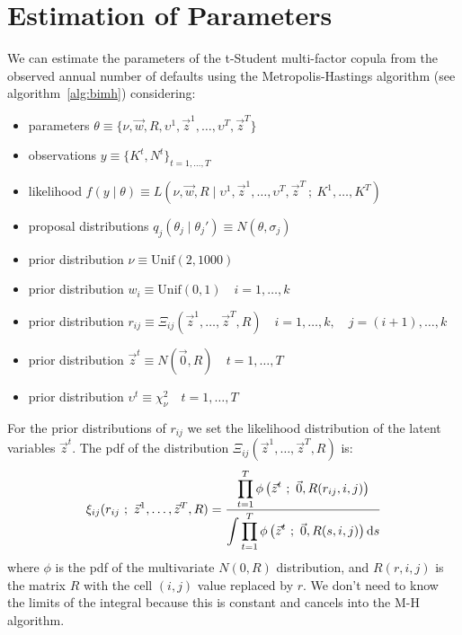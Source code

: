 \documentclass[11pt,fleqn]{book} %
\begin{document}
\section{Estimation of Parameters}

\begin{proposition}
	\label{prop:pemh}
	We can estimate the parameters of the t-Student multi-factor copula from 
	the observed annual number of defaults using the Metropolis-Hastings 
	algorithm (see algorithm~\ref{alg:bimh}) considering:
	\begin{itemize}
		\item parameters $\theta \equiv \{ \nu,\vec{w},R,\upsilon^1,\vec{z}^1,\dots,\upsilon^T,\vec{z}^T\}$
		\item observations $y \equiv \{K^t, N^t\}_{t=1,\dots,T}$
		\item likelihood $f(y \mid \theta) \equiv L(\nu,\vec{w},R  \mid  \upsilon^1,\vec{z}^1,\dots,\upsilon^T,\vec{z}^T\ ;\ K^1,\dots,K^T)$
		\item proposal distributions $q_j(\theta_j \mid \theta_j') \equiv N(\theta,\sigma_j)$
		\item prior distribution $\nu \equiv \text{Unif}(2,1000)$
		\item prior distribution $w_i \equiv \text{Unif}(0,1) \quad i=1,\dots,k$
		\item prior distribution $r_{ij} \equiv \Xi_{ij}(\vec{z}^1,\dots,\vec{z}^T,R) \quad i=1,\dots,k, \quad j=(i+1),\dots,k$
		\item prior distribution $\vec{z}^t \equiv N(\vec{0},R) \quad t=1,\dots,T$
		\item prior distribution $\upsilon^t \equiv \chi_{\nu}^2 \quad t=1,\dots,T$
	\end{itemize}
	For the prior distributions of $r_{ij}$ we set the likelihood distribution
	of the latent variables $\vec{z}^t$. The pdf of the distribution 
	$\Xi_{ij}(\vec{z}^1,\dots,\vec{z}^T,R)$ is:
	\begin{displaymath}
		\xi_{ij}(r_{ij}\ ;\ \vec{z}^1,\dots,\vec{z}^T,R) = \frac
		{\displaystyle \prod_{t=1}^{T} \phi\left( \vec{z}^t\ ;\ \vec{0}, R(r_{ij},i,j) \right)}
		{\displaystyle \int \prod_{t=1}^{T} \phi\left( \vec{z}^t\ ;\ \vec{0}, R(s,i,j) \right) \ud s}
	\end{displaymath}
	where $\phi$ is the pdf of the multivariate $N(0,R)$ distribution,
	and $R(r,i,j)$ is the matrix $R$ with the cell $(i,j)$ value 
	replaced by $r$. We don't need to know the limits of the integral
	because this is constant and cancels into the M-H algorithm.
\end{proposition}
\end{document}
